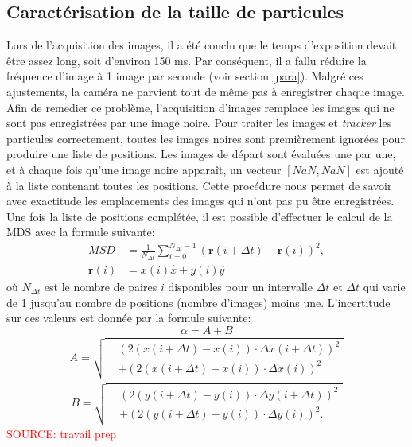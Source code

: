 \documentclass[11pt,letterpaper]{article}
\begin{document}
\subsection{Caractérisation de la taille de particules}
Lors de l'acquisition des images, il a été conclu que le temps d'exposition devait être assez long, soit d'environ 150 ms. Par conséquent, il a fallu réduire 
la fréquence d'image à 1 image par seconde (voir section \ref{para}). Malgré ces ajustements, la caméra ne parvient tout de même
pas à enregistrer chaque image. Afin de remedier ce problème, l'acquisition d'images remplace les images qui ne sont pas enregistrées par une image noire. 
Pour traiter les images et \textit{tracker} les particules correctement, toutes les images noires sont premièrement ignorées pour 
produire une liste de positions. Les images de départ sont évaluées une par une, et à chaque fois qu'une
image noire apparaît, un vecteur $[NaN ,NaN]$ est ajouté à la liste contenant toutes les positions.
Cette procédure nous permet de savoir avec exactitude les emplacements des images qui n'ont pas pu être enregistrées. Une fois la liste de positions 
complétée, il est possible d'effectuer le calcul de la MDS avec la formule suivante: 
 \begin{align}
  MSD &= \frac{1}{N_{\Delta t}} \sum_{i=0}^{N_{\Delta t} - 1} \left( \mathbf{r}(i+\Delta t) - \mathbf{r}(i) \right)^2,\\ 
  \mathbf{r}(i) &= x(i)\hat{x}+ y(i)\hat{y}
\end{align}
où $N_{\Delta t}$ est le nombre de paires $i$ disponibles pour un intervalle $\Delta t$ et $\Delta t$ qui varie de 1 jusqu'au nombre de positions (nombre d'images) moins une. 
L'incertitude sur ces valeurs est donnée par la formule suivante: 
\begin{equation}
  \alpha =A+B
\end{equation}
\begin{align*}
  A = \sqrt{
    \begin{aligned}
      &\left( 2(x(i+\Delta t) - x(i))\cdot \Delta x(i+\Delta t) \right)^2 \\
      &+ \left( 2(x(i+\Delta t) - x(i))\cdot \Delta x(i) \right)^2
    \end{aligned}
  }
\end{align*}
\begin{align*}
  B = \sqrt{
    \begin{aligned}
      &\left( 2(y(i+\Delta t) - y(i))\cdot \Delta y(i+\Delta t) \right)^2 \\
      &+ \left( 2(y(i+\Delta t) - y(i))\cdot \Delta y(i) \right)^2.
    \end{aligned}
  }
\end{align*}
\textcolor{red}{SOURCE: travail prep}
\end{document}
